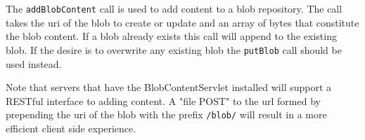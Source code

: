 The \verb+addBlobContent+ call is used to add content to a blob repository. The call
takes the uri of the blob to create or update and an array of bytes that constitute the blob
content. If a blob already exists this call will append to the existing blob. If the desire is to
overwrite any existing blob the \verb+putBlob+ call should be used instead.

Note that \Rapture servers that have the BlobContentServlet installed will support a RESTful interface
to adding content. A "file POST" to the url formed by prepending the uri of the blob with the prefix
\verb+/blob/+ will result in a more efficient client side experience.
